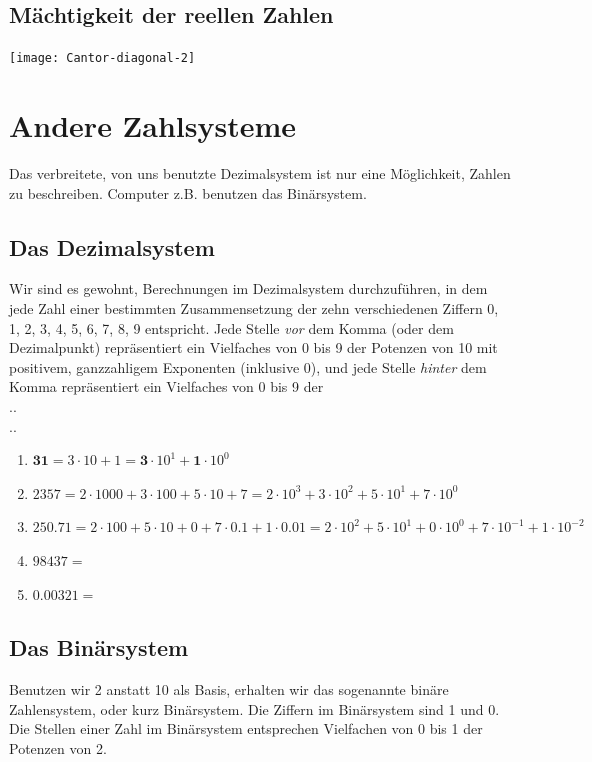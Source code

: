 \subsection{Mächtigkeit der reellen Zahlen}
\texttt{[image: Cantor-diagonal-2]}

\newpage

\section{Andere Zahlsysteme}
Das verbreitete, von uns benutzte Dezimalsystem ist nur eine Möglichkeit, Zahlen zu beschreiben. Computer z.B. benutzen das Binärsystem.

\subsection*{Das Dezimalsystem}
Wir sind es gewohnt, Berechnungen im Dezimalsystem durchzuführen, in dem jede Zahl einer bestimmten Zusammensetzung der zehn verschiedenen Ziffern 0, 1, 2, 3, 4, 5, 6, 7, 8, 9 entspricht. Jede Stelle \emph{vor} dem Komma (oder dem Dezimalpunkt) repräsentiert ein Vielfaches von 0 bis 9 der Potenzen von 10 mit positivem, ganzzahligem Exponenten (inklusive 0), und jede Stelle \emph{hinter} dem Komma repräsentiert ein Vielfaches von 0 bis 9 der \vspace{.6cm} \\ \vspace{.6cm} .\dotfill{}. \\  .\dotfill{}.

\begin{example}\hfill
    \begin{enumerate}
        \item $\textbf{31} = 3 \cdot 10 + 1 = \textbf{3} \cdot 10^1 + \textbf{1} \cdot 10^0$
        \item $2357 = 2 \cdot 1000 + 3 \cdot 100 + 5 \cdot 10 + 7 = 2 \cdot 10^3 + 3 \cdot 10^2 + 5 \cdot 10^1 + 7 \cdot 10^0$
        \item $250.71 = 2 \cdot 100 + 5 \cdot 10 + 0 + 7 \cdot 0.1 + 1 \cdot 0.01 = 2 \cdot 10^2 + 5 \cdot 10^1 + 0 \cdot 10^0 + 7 \cdot 10^{-1} + 1 \cdot 10^{-2}$
        \item $98437=$
        \item $0.00321=$
    \end{enumerate}
\end{example}

\subsection*{Das Binärsystem}
Benutzen wir 2 anstatt 10 als Basis, erhalten wir das sogenannte binäre Zahlensystem, oder kurz Binärsystem. Die Ziffern im Binärsystem sind 1 und 0. Die Stellen einer Zahl im Binärsystem entsprechen Vielfachen von 0 bis 1 der Potenzen von 2.

